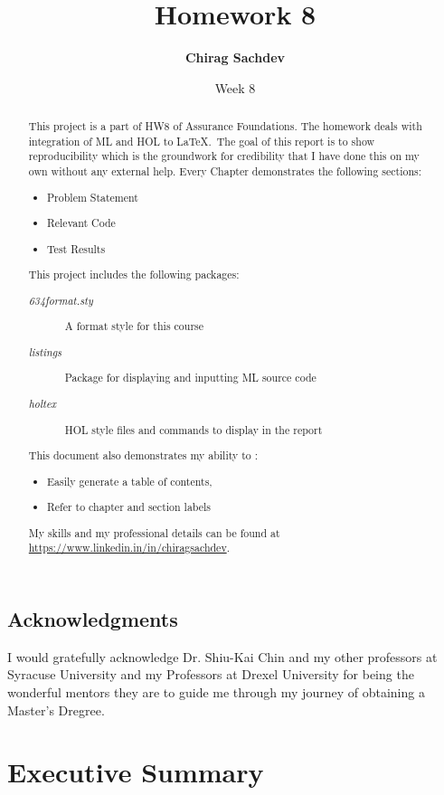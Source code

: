 \documentclass{report}
\title{Homework 8}
\author{\textbf{Chirag Sachdev}}
\date{Week 8}
\begin{document}
\lstset{language=ML}
\maketitle{}

\begin{abstract}
This project is a part of HW8 of Assurance Foundations. The homework deals with integration of ML and HOL to \LaTeX.\ The goal of this report is to show reproducibility which is the groundwork for credibility that I have done this on my own without any external help. Every Chapter demonstrates the following sections:
	\begin{itemize}
		\item Problem Statement
		\item Relevant Code
		\item Test Results
	\end{itemize}
	
This project includes the following packages:
	\begin{description}
		\item[\emph{634format.sty}] A format style for this course
		\item[\emph{listings}] Package for displaying and inputting ML source code
		\item[\emph{holtex}] HOL style files and commands to display in the report
	\end{description}

This document also demonstrates my ability to :
	\begin{itemize}
		\item Easily generate a table of contents,
		\item Refer to chapter and section labels
	\end{itemize}

My skills and my professional details can be found at \url{https://www.linkedin.in/in/chiragsachdev}.
\end{abstract}

\section*{Acknowledgments}
I would gratefully acknowledge Dr. Shiu-Kai Chin and my other professors at Syracuse University and my Professors at Drexel University for being the wonderful mentors they are to guide me through my journey of obtaining a Master's Dregree.

\tableofcontents{}

\chapter{Executive Summary}
\label{cha:executive-summary}
\end{document}
